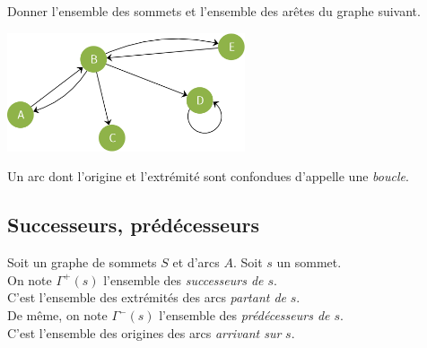\begin{exercice}[]
    Donner l'ensemble des sommets et l'ensemble des arêtes du graphe suivant.
    \begin{center}
        \includegraphics[width=7cm]{graphes/img/exo_graphe.png}
    \end{center}
\end{exercice}

\begin{definition}[ : boucle]
    Un arc dont l'origine et l'extrémité sont confondues d'appelle une \textit{boucle}.
\end{definition}

\subsection{Successeurs, prédécesseurs}

\begin{definition}
    Soit un graphe de sommets $S$ et d'arcs $A$. Soit $s$ un sommet.\\
    On note $\Gamma^+(s)$ l'ensemble des \textit{successeurs de $s$}.\\
    C'est l'ensemble des extrémités des arcs \textit{partant de} $s$.\\
    De même, on note $\Gamma^-(s)$ l'ensemble des \textit{prédécesseurs de $s$}.\\
    C'est l'ensemble des origines des arcs \textit{arrivant sur} $s$.\\
\end{definition}

